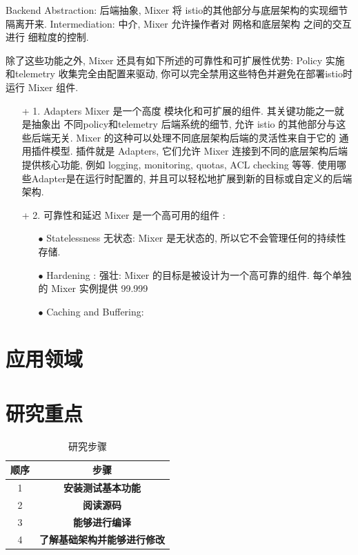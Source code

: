 \documentclass{ctexart}
\begin{document}
Backend Abstraction: 后端抽象, Mixer 将 istio的其他部分与底层架构的实现细节 隔离开来.
Intermediation: 中介, Mixer 允许操作者对 网格和底层架构 之间的交互进行 细粒度的控制.

除了这些功能之外, Mixer 还具有如下所述的可靠性和可扩展性优势:
Policy 实施和telemetry 收集完全由配置来驱动, 你可以完全禁用这些特色并避免在部署istio时运行 Mixer 组件.
\begin{enumerate}
	\item [+] 1. Adapters
	Mixer 是一个高度 模块化和可扩展的组件.
	其关键功能之一就是抽象出 不同policy和telemetry 后端系统的细节, 允许 istio 的其他部分与这些后端无关.
	Mixer 的这种可以处理不同底层架构后端的灵活性来自于它的 通用插件模型.
	插件就是 Adapters, 它们允许 Mixer 连接到不同的底层架构后端提供核心功能, 例如 logging, monitoring, quotas, ACL checking 等等.
	使用哪些Adapter是在运行时配置的, 并且可以轻松地扩展到新的目标或自定义的后端架构.
	\item [+] 2. 可靠性和延迟
	Mixer 是一个高可用的组件 :
	\begin{enumerate}
		\item [$\bullet$] Statelessness 无状态: Mixer 是无状态的, 所以它不会管理任何的持续性存储.
		\item [$\bullet$] Hardening : 强壮: Mixer 的目标是被设计为一个高可靠的组件. 每个单独的 Mixer 实例提供 99.999%
		\item [$\bullet$] Caching and Buffering:
		
	\end{enumerate}
\end{enumerate}






\section{应用领域}

\section{研究重点}



\begin{table}[h]
	\centering
	\caption{研究步骤}
	\begin{tabular}{|c|c|}
		\hline
		顺序 & 步骤 \\\hline
		1 & \textbf{安装测试基本功能} \\\hline
		2 & \textbf{阅读源码} \\\hline
		3 & \textbf{能够进行编译} \\\hline
		4 & \textbf{了解基础架构并能够进行修改} \\\hline
	\end{tabular}
\end{table}
\end{document}
